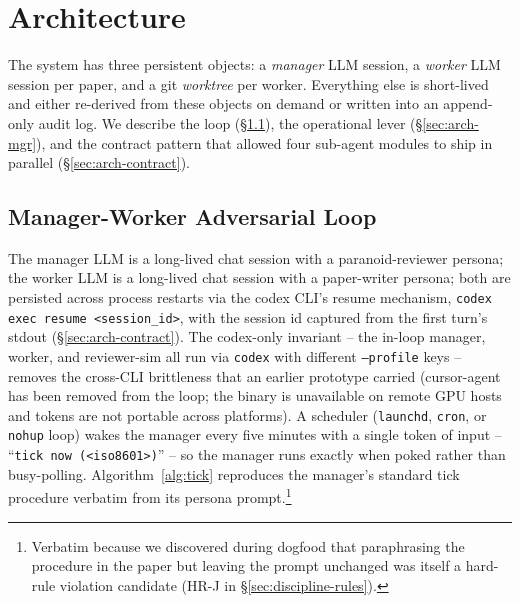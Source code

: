 \section{Architecture}
\label{sec:arch}

The system has three persistent objects: a \emph{manager} LLM session, a
\emph{worker} LLM session per paper, and a git \emph{worktree} per worker.
Everything else is short-lived and either re-derived from these objects on
demand or written into an append-only audit log. We describe the loop
(\S\ref{sec:arch-loop}), the operational lever
(\S\ref{sec:arch-mgr}), and the contract pattern that allowed four sub-agent
modules to ship in parallel (\S\ref{sec:arch-contract}).

\subsection{Manager-Worker Adversarial Loop}
\label{sec:arch-loop}

The manager LLM is a long-lived chat session with a paranoid-reviewer
persona; the worker LLM is a long-lived chat session with a paper-writer
persona; both are persisted across process restarts via the codex CLI's
resume mechanism, \texttt{codex exec resume <session\_id>}, with the
session id captured from the first turn's stdout
(\S\ref{sec:arch-contract}). The codex-only invariant -- the in-loop
manager, worker, and reviewer-sim all run via \texttt{codex} with
different \texttt{--profile} keys -- removes the cross-CLI brittleness
that an earlier prototype carried (cursor-agent has been removed from
the loop; the binary is unavailable on remote GPU hosts and tokens are
not portable across platforms).
A scheduler (\texttt{launchd},
\texttt{cron}, or \texttt{nohup} loop) wakes the manager every five minutes
with a single token of input -- ``\texttt{tick now (<iso8601>)}'' -- so the
manager runs exactly when poked rather than busy-polling.
Algorithm~\ref{alg:tick} reproduces the manager's standard tick procedure
verbatim from its persona prompt.\footnote{Verbatim because we discovered
during dogfood that paraphrasing the procedure in the paper but leaving
the prompt unchanged was itself a hard-rule violation candidate (HR-J in
\S\ref{sec:discipline-rules}).}

